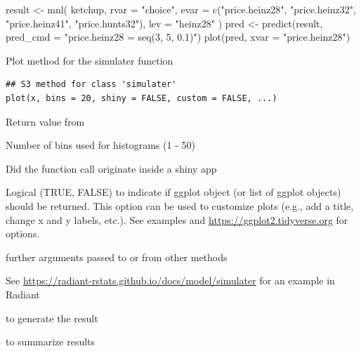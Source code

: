 \documentclass[a4paper]{book}
\begin{document}
%
\begin{Examples}
\begin{ExampleCode}
result <- mnl(
  ketchup,
  rvar = "choice",
  evar = c("price.heinz28", "price.heinz32", "price.heinz41", "price.hunts32"),
  lev = "heinz28"
)
pred <- predict(result, pred_cmd = "price.heinz28 = seq(3, 5, 0.1)")
plot(pred, xvar = "price.heinz28")

\end{ExampleCode}
\end{Examples}
%
\begin{Description}
Plot method for the simulater function
\end{Description}
%
\begin{Usage}
\begin{verbatim}
## S3 method for class 'simulater'
plot(x, bins = 20, shiny = FALSE, custom = FALSE, ...)
\end{verbatim}
\end{Usage}
%
\begin{Arguments}
\begin{ldescription}
\item[\code{x}] Return value from 

\item[\code{bins}] Number of bins used for histograms (1 - 50)

\item[\code{shiny}] Did the function call originate inside a shiny app

\item[\code{custom}] Logical (TRUE, FALSE) to indicate if ggplot object (or list of ggplot objects) should be returned. This option can be used to customize plots (e.g., add a title, change x and y labels, etc.). See examples and \url{https://ggplot2.tidyverse.org} for options.

\item[\code{...}] further arguments passed to or from other methods
\end{ldescription}
\end{Arguments}
%
\begin{Details}
See \url{https://radiant-rstats.github.io/docs/model/simulater} for an example in Radiant
\end{Details}
%
\begin{SeeAlso}
 to generate the result

 to summarize results
\end{SeeAlso}
\end{document}
